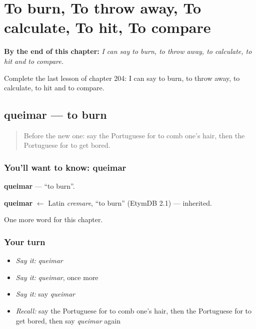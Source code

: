 
\chapter{To burn, To throw away, To calculate, To hit, To compare}
\label{ch:pt-to-burn-to-throw-away-to-calculate-to-hit-to-compare}

\begin{chapteropening}
\textbf{By the end of this chapter:} \emph{I can say to burn, to throw away, to calculate, to hit and to compare.}

Complete the last lesson of chapter 204: I can say to burn, to throw away, to calculate, to hit and to compare.
\end{chapteropening}

\section[queimar]{queimar — to burn}

\label{lesson:PT-C204-queimar}



\begin{quote}
Before the new one: say the Portuguese for to comb one's hair, then the Portuguese for to get bored.
\end{quote}

\subsection*{You'll want to know: queimar}
\textbf{queimar} — \textquotedblleft{}to burn\textquotedblright{}.

\begin{cousinweb}
\textbf{queimar} $\leftarrow$ Latin \emph{cremare}, \textquotedblleft{}to burn\textquotedblright{} (EtymDB 2.1) — inherited.
\end{cousinweb}

\begin{grammarlens}[title={What you've built}]
One more word for this chapter.
\end{grammarlens}

\subsection*{Your turn}
\begin{itemize}
\raggedright
  \item \emph{Say it:} \emph{queimar}
  \item \emph{Say it:} \emph{queimar}, once more
  \item \emph{Say it:} say \emph{queimar}
  \item \emph{Recall:} say the Portuguese for to comb one's hair, then the Portuguese for to get bored, then say \emph{queimar} again
\end{itemize}

